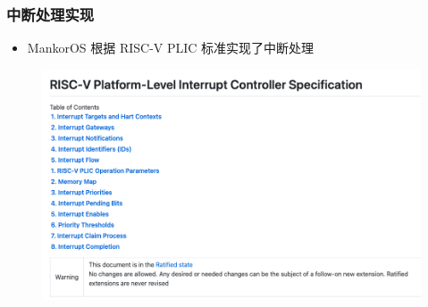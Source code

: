 \begin{frame}
    \frametitle{中断处理实现}

    \begin{itemize}
        \item MankorOS 根据 RISC-V PLIC 标准实现了中断处理
    \end{itemize}

    \begin{figure}
        \includegraphics[width=.5\textwidth]{assets/plic.png}
    \end{figure}

\end{frame}